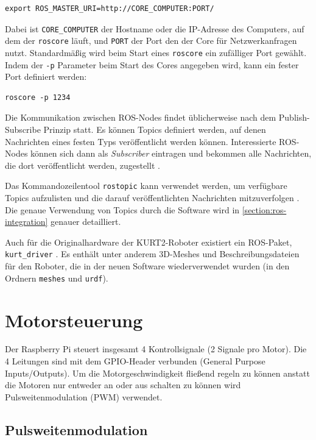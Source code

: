 \documentclass[german]{thesis_KBS}
\newcommand{\code}[1]{\texttt{#1}}  %
\begin{document}
\begin{lstlisting}[numbers=none]
    export ROS_MASTER_URI=http://CORE_COMPUTER:PORT/
\end{lstlisting}

Dabei ist \code{CORE\_COMPUTER} der Hostname oder die IP-Adresse des Computers,
auf dem der \code{roscore} läuft, und \code{PORT} der Port den der Core für
Netzwerkanfragen nutzt. Standardmäßig wird beim Start eines \code{roscore} ein
zufälliger Port gewählt. Indem der \code{-p} Parameter beim Start des Cores
angegeben wird, kann ein fester Port definiert werden:

\begin{lstlisting}[numbers=none]
    roscore -p 1234
\end{lstlisting}

Die Kommunikation zwischen ROS-Nodes findet üblicherweise nach dem
Publish-Subscribe Prinzip statt. Es können Topics definiert werden, auf denen
Nachrichten eines festen Typs veröffentlicht werden können. Interessierte
ROS-Nodes können sich dann als \emph{Subscriber} eintragen und bekommen alle
Nachrichten, die dort veröffentlicht werden, zugestellt
\cite{rostopic-tutorial}.

Das Kommandozeilentool \code{rostopic} kann verwendet werden, um verfügbare
Topics aufzulisten und die darauf veröffentlichten Nachrichten mitzuverfolgen
\cite{rostopic}. Die genaue Verwendung von Topics durch die Software wird in
\autoref{section:ros-integration} genauer detailliert.

Auch für die Originalhardware der KURT2-Roboter existiert ein ROS-Paket,
\code{kurt\_driver} \cite{kurt-driver}. Es enthält unter anderem 3D-Meshes und
Beschreibungsdateien für den Roboter, die in der neuen Software wiederverwendet
wurden (in den Ordnern \code{meshes} und \code{urdf}).


\section{Motorsteuerung}

Der Raspberry Pi steuert insgesamt 4 Kontrollsignale (2 Signale pro Motor). Die
4 Leitungen sind mit dem GPIO-Header verbunden (General Purpose Inputs/Outputs).
Um die Motorgeschwindigkeit fließend regeln zu können anstatt die Motoren nur
entweder an oder aus schalten zu können wird Pulsweitenmodulation (PWM)
verwendet.


\subsection{Pulsweitenmodulation}
\end{document}
